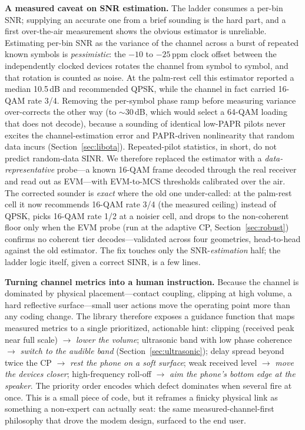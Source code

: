 \documentclass[11pt]{article}
\begin{document}
\textbf{A measured caveat on SNR estimation.} The ladder consumes a per-bin SNR;
supplying an accurate one from a brief sounding is the hard part, and a first
over-the-air measurement shows the obvious estimator is unreliable. Estimating
per-bin SNR as the variance of the channel across a burst of repeated known
symbols is \emph{pessimistic}: the $-10$ to $-25$\,ppm clock offset between the
independently clocked devices rotates the channel from symbol to symbol, and that
rotation is counted as noise. At the palm-rest cell this estimator reported a
median 10.5\,dB and recommended QPSK, while the channel in fact carried 16-QAM
rate 3/4. Removing the per-symbol phase ramp before measuring variance
over-corrects the other way (to $\sim$30\,dB, which would select a 64-QAM loading
that does not decode), because a sounding of identical low-PAPR pilots never
excites the channel-estimation error and PAPR-driven nonlinearity that random
data incurs (Section~\ref{sec:libota}). Repeated-pilot statistics, in short, do
not predict random-data SINR. We therefore replaced the estimator with a
\emph{data-representative} probe---a known 16-QAM frame decoded through the real
receiver and read out as EVM---with EVM-to-MCS thresholds calibrated over the air.
The corrected sounder is \emph{exact} where the old one under-called: at the
palm-rest cell it now recommends 16-QAM rate 3/4 (the measured ceiling) instead of
QPSK, picks 16-QAM rate 1/2 at a noisier cell, and drops to the non-coherent floor
only when the EVM probe (run at the adaptive CP, Section~\ref{sec:robust}) confirms
no coherent tier decodes---validated across four geometries, head-to-head against
the old estimator. The fix touches only the SNR-\emph{estimation} half; the ladder
logic itself, given a correct SINR, is a few lines.

\textbf{Turning channel metrics into a human instruction.} Because the channel is
dominated by physical placement---contact coupling, clipping at high volume, a
hard reflective surface---small user actions move the operating point more than
any coding change. The library therefore exposes a guidance function that maps
measured metrics to a single prioritized, actionable hint: clipping (received
peak near full scale) $\rightarrow$ \emph{lower the volume}; ultrasonic band with
low phase coherence $\rightarrow$ \emph{switch to the audible band}
(Section~\ref{sec:ultrasonic}); delay spread beyond twice the CP $\rightarrow$
\emph{rest the phone on a soft surface}; weak received level $\rightarrow$
\emph{move the devices closer}; high-frequency roll-off $\rightarrow$ \emph{aim
the phone's bottom edge at the speaker}. The priority order encodes which defect
dominates when several fire at once. This is a small piece of code, but it
reframes a finicky physical link as something a non-expert can actually seat: the
same measured-channel-first philosophy that drove the modem design, surfaced to
the end user.
\end{document}
